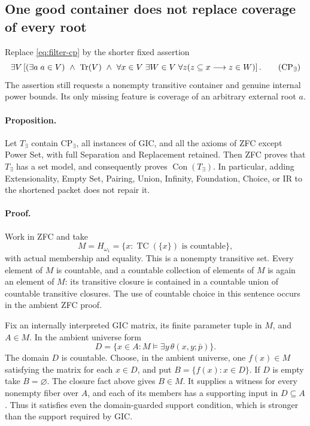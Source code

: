\subsection{One good container does not replace coverage of every root}

Replace \eqref{eq:filter-cp} by the shorter fixed assertion
\begin{equation}
\exists V\left[
 (\exists a\;a\in V)\ \land\ \operatorname{Tr}(V)\ \land\
 \forall x\in V\;\exists W\in V\;\forall z
       (z\subseteq x\longrightarrow z\in W)\right].
\tag{CP$_{\exists}$}\label{eq:filter-rootless}
\end{equation}
The assertion still requests a nonempty transitive container and genuine
internal power bounds.  Its only missing feature is coverage of an arbitrary
external root $a$.

\paragraph{Proposition.}
Let $T_{\exists}$ contain $\mathrm{CP}_{\exists}$, all instances of GIC,
and all the axioms of ZFC except Power Set, with full Separation and
Replacement retained.  Then ZFC proves that $T_{\exists}$ has a set model,
and consequently proves $\operatorname{Con}(T_{\exists})$.  In particular,
adding Extensionality, Empty Set, Pairing, Union, Infinity, Foundation,
Choice, or IR to the shortened packet does not repair it.

\paragraph{Proof.}
Work in ZFC and take
\[
 M=H_{\omega_1}
   =\{x: \operatorname{TC}(\{x\})\text{ is countable}\},
\]
with actual membership and equality.  This is a nonempty transitive set.
Every element of $M$ is countable, and a countable collection of elements
of $M$ is again an element of $M$: its transitive closure is contained in
a countable union of countable transitive closures.  The use of countable
choice in this sentence occurs in the ambient ZFC proof.

Fix an internally interpreted GIC matrix, its finite parameter tuple in
$M$, and $A\in M$.  In the ambient universe form
\[
 D=\{x\in A:M\models\exists y\,\theta(x,y;\bar p)\}.
\]
The domain $D$ is countable.  Choose, in the ambient universe, one
$f(x)\in M$ satisfying the matrix for each $x\in D$, and put
$B=\{f(x):x\in D\}$.  If $D$ is empty take $B=\varnothing$.
The closure fact above gives $B\in M$.  It supplies a witness for every
nonempty fiber over $A$, and each of its members has a supporting input
in $D\subseteq A$.  Thus it satisfies even the domain-guarded support
condition, which is stronger than the support required by GIC.

